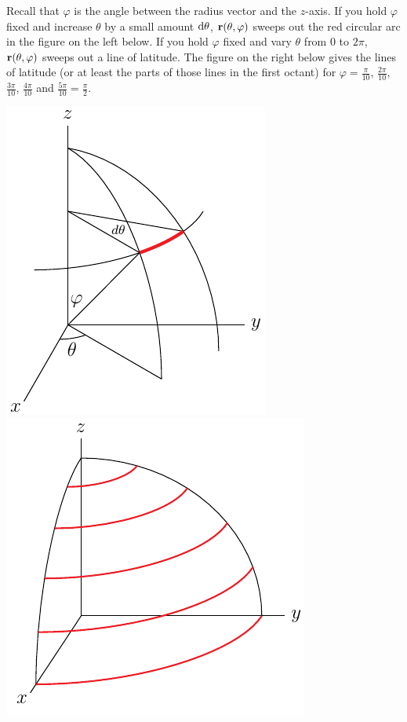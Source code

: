 \begin{eg}[Sphere]
Recall that $\varphi$ is the angle between the radius vector and the 
$z$-axis. If you hold $\varphi$ fixed and increase $\theta$ by a small amount
$\mathrm{d}\theta$, $\mathbf{r}(\theta,\varphi)$ sweeps out the red circular arc in the
figure on the left below.  
If you hold $\varphi$ fixed  and vary $\theta$ from $0$ to $2\pi$, 
$\mathbf{r}(\theta,\varphi)$ sweeps out a line of latitude. The figure on the 
right below gives the lines of latitude (or at least the parts of those 
lines in the first octant) for 
$\varphi=\frac{\pi}{10}$, $\frac{2\pi}{10}$, $\frac{3\pi}{10}$, $\frac{4\pi}{10}$
and $\frac{5\pi}{10}=\frac{\pi}{2}$.
\begin{efig}
\begin{center}
    \includegraphics[scale=1.05]{sphericalTh.pdf}\qquad
    \includegraphics{sphericalLat.pdf}

\end{center}
\end{efig}
\end{eg}
